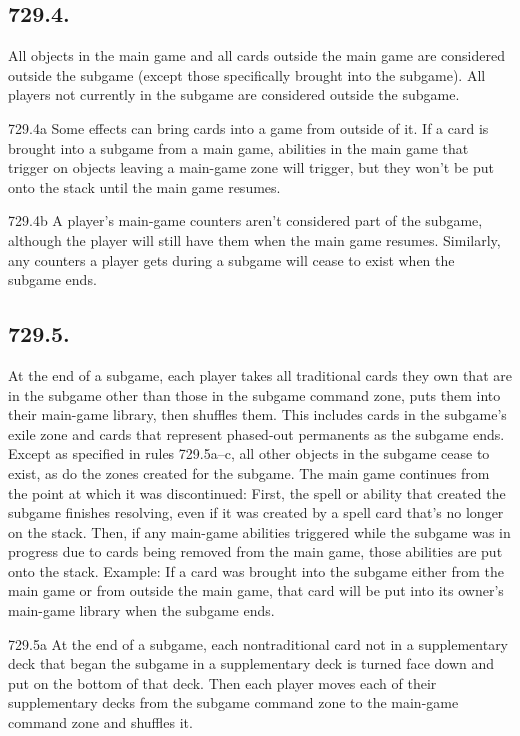 \subsection*{729.4.}
All objects in the main game and all cards outside the main game are considered outside the subgame (except those specifically brought into the subgame). All players not currently in the subgame are considered outside the subgame.

729.4a Some effects can bring cards into a game from outside of it. If a card is brought into a subgame from a main game, abilities in the main game that trigger on objects leaving a main-game zone will trigger, but they won’t be put onto the stack until the main game resumes.

729.4b A player’s main-game counters aren’t considered part of the subgame, although the player will still have them when the main game resumes. Similarly, any counters a player gets during a subgame will cease to exist when the subgame ends.

\subsection*{729.5.}
At the end of a subgame, each player takes all traditional cards they own that are in the subgame other than those in the subgame command zone, puts them into their main-game library, then shuffles them. This includes cards in the subgame’s exile zone and cards that represent phased-out permanents as the subgame ends. Except as specified in rules 729.5a–c, all other objects in the subgame cease to exist, as do the zones created for the subgame. The main game continues from the point at which it was discontinued: First, the spell or ability that created the subgame finishes resolving, even if it was created by a spell card that’s no longer on the stack. Then, if any main-game abilities triggered while the subgame was in progress due to cards being removed from the main game, those abilities are put onto the stack.
Example: If a card was brought into the subgame either from the main game or from outside the main game, that card will be put into its owner’s main-game library when the subgame ends.

729.5a At the end of a subgame, each nontraditional card not in a supplementary deck that began the subgame in a supplementary deck is turned face down and put on the bottom of that deck. Then each player moves each of their supplementary decks from the subgame command zone to the main-game command zone and shuffles it.

